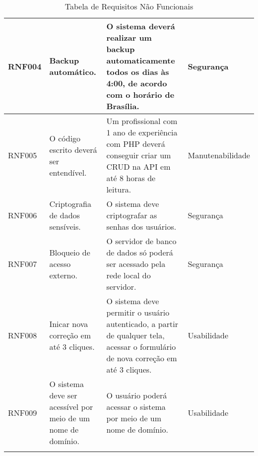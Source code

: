 \begin{landscape}
\begin{longtable}{|p{1.5cm}|p{4.5cm}|p{10cm}|p{3cm}|}
    RNF004 & Backup automático.                                           & O sistema deverá realizar um backup automaticamente todos os dias às 4:00, de acordo com o horário de Brasília.                   & Segurança        \\\hline
    RNF005 & O código escrito deverá ser entendível.                      & Um profissional com 1 ano de experiência com PHP deverá conseguir criar um CRUD na API em até 8 horas de leitura.                 & Manutenabilidade \\\hline
    RNF006 & Criptografia de dados sensíveis.                             & O sistema deve criptografar as senhas dos usuários.                                                                               & Segurança        \\\hline
    RNF007 & Bloqueio de acesso externo.                                  & O servidor de banco de dados só poderá ser acessado pela rede local do servidor.                                                  & Segurança        \\\hline
    RNF008 & Inicar nova correção em até 3 cliques.                       & O sistema deve permitir o usuário autenticado, a partir de qualquer tela, acessar o formulário de nova correção em até 3 cliques. & Usabilidade      \\\hline
    RNF009 & O sistema deve ser acessível por meio de um nome de domínio. & O usuário poderá acessar o sistema por meio de um nome de domínio.                                                                & Usabilidade      \\\hline
    \caption{Tabela de Requisitos Não Funcionais}
    \label{rnf:tabela}
\end{longtable}
\end{landscape}
